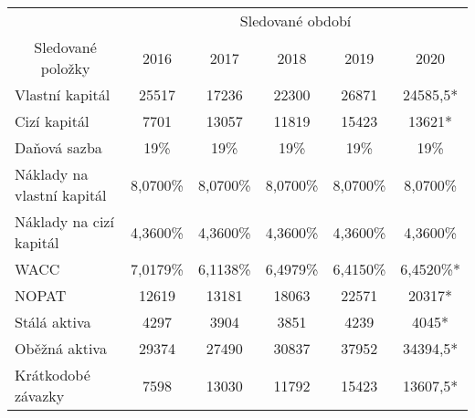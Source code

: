 \begin{table}[!hbtp]
\centering
\begin{tabular}{|l|ccccc|}
\hline
\multicolumn{1}{|c|}{} & \multicolumn{5}{c|}{Sledované období} \\ \cline{2-6} 
\multicolumn{1}{|c|}{\multirow{-2}{*}{Sledované položky}} & \multicolumn{1}{c|}{2016} & \multicolumn{1}{c|}{2017} & \multicolumn{1}{c|}{2018} & \multicolumn{1}{c|}{2019} & 2020 \\ \hline
Vlastní kapitál & \multicolumn{1}{c|}{25517} & \multicolumn{1}{c|}{17236} & \multicolumn{1}{c|}{22300} & \multicolumn{1}{c|}{26871} & 24585,5* \\ \hline
Cizí kapitál & \multicolumn{1}{c|}{7701} & \multicolumn{1}{c|}{13057} & \multicolumn{1}{c|}{11819} & \multicolumn{1}{c|}{15423} & 13621* \\ \hline
Daňová sazba & \multicolumn{1}{c|}{19\%} & \multicolumn{1}{c|}{19\%} & \multicolumn{1}{c|}{19\%} & \multicolumn{1}{c|}{19\%} & 19\% \\ \hline
\rowcolor[HTML]{C0C0C0} 
Náklady na vlastní kapitál & \multicolumn{1}{c|}{\cellcolor[HTML]{C0C0C0}8,0700\%} & \multicolumn{1}{c|}{\cellcolor[HTML]{C0C0C0}8,0700\%} & \multicolumn{1}{c|}{\cellcolor[HTML]{C0C0C0}8,0700\%} & \multicolumn{1}{c|}{\cellcolor[HTML]{C0C0C0}8,0700\%} & 8,0700\% \\ \hline
Náklady na cizí kapitál & \multicolumn{1}{c|}{4,3600\%} & \multicolumn{1}{c|}{4,3600\%} & \multicolumn{1}{c|}{4,3600\%} & \multicolumn{1}{c|}{4,3600\%} & 4,3600\% \\ \hline
\rowcolor[HTML]{C0C0C0} 
WACC & \multicolumn{1}{c|}{\cellcolor[HTML]{C0C0C0}7,0179\%} & \multicolumn{1}{c|}{\cellcolor[HTML]{C0C0C0}6,1138\%} & \multicolumn{1}{c|}{\cellcolor[HTML]{C0C0C0}6,4979\%} & \multicolumn{1}{c|}{\cellcolor[HTML]{C0C0C0}6,4150\%} & 6,4520\%* \\ \hline
NOPAT & \multicolumn{1}{c|}{12619} & \multicolumn{1}{c|}{13181} & \multicolumn{1}{c|}{18063} & \multicolumn{1}{c|}{22571} & 20317* \\ \hline
Stálá aktiva & \multicolumn{1}{c|}{4297} & \multicolumn{1}{c|}{3904} & \multicolumn{1}{c|}{3851} & \multicolumn{1}{c|}{4239} & 4045* \\ \hline
Oběžná aktiva & \multicolumn{1}{c|}{29374} & \multicolumn{1}{c|}{27490} & \multicolumn{1}{c|}{30837} & \multicolumn{1}{c|}{37952} & 34394,5* \\ \hline
Krátkodobé závazky & \multicolumn{1}{c|}{7598} & \multicolumn{1}{c|}{13030} & \multicolumn{1}{c|}{11792} & \multicolumn{1}{c|}{15423} & 13607,5* \\ \hline

\end{tabular}
\end{table}
